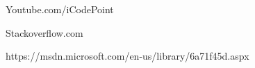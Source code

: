\begin{thebibliography}{99999}
\singlespace\normalsize




 Youtube.com/iCodePoint

 Stackoverflow.com

 https://msdn.microsoft.com/en-us/library/6a71f45d.aspx

\end{thebibliography}
